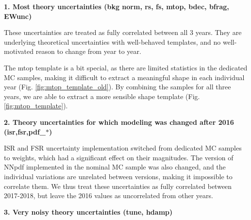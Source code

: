\par \noindent
\textbf{1. Most theory uncertainties (bkg norm, rs, fs, mtop, bdec, bfrag, EWunc)}

These uncertainties are treated as fully correlated between all 3 years. They are underlying theoretical uncertainties with well-behaved templates, and  no well-motivated reason to change from year to year. 

The mtop template is a bit special, as there are limited statistics in the dedicated MC samples, making it difficult to extract a meaningful shape in each individual year (Fig. \ref{fig:mtop_template_old}). 
By combining the samples for all three years, we are able to extract a more sensible shape template (Fig. \ref{fig:mtop_template}).

\par \noindent
\textbf{2. Theory uncertainties for which modeling was changed after 2016 (isr,fsr,pdf\_$\ast$)}

ISR and FSR uncertainty implementation switched from dedicated MC samples to weights, which had a significant effect on their magnitudes. The version of NNpdf implemented in the nominal MC sample was also changed, and the individual variations are unrelated between versions, making it impossible to correlate them. We thus treat these uncertainties as fully correlated between 2017-2018, but leave the 2016 values as uncorrelated from other years.



\par \noindent
\textbf{3. Very noisy theory uncertainties (tune, hdamp)}

